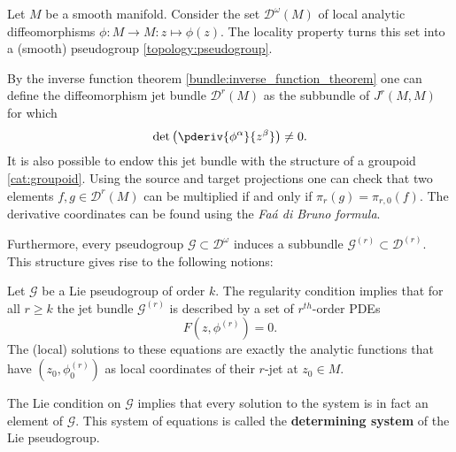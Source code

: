    \begin{example}
        Let $M$ be a smooth manifold. Consider the set $\mathcal{D}^\omega(M)$ of local analytic diffeomorphisms $\phi:M\rightarrow M:z\mapsto\phi(z)$. The locality property turns this set into a (smooth) pseudogroup \ref{topology:pseudogroup}.

        By the inverse function theorem \ref{bundle:inverse_function_theorem} one can define the diffeomorphism jet bundle $\mathcal{D}^r(M)$ as the subbundle of $J^r(M,M)$ for which \[\det\left(\pderiv{\phi^\alpha}{z^\beta}\right)\neq0.\] It is also possible to endow this jet bundle with the structure of a groupoid \ref{cat:groupoid}. Using the source and target projections one can check that two elements $f,g\in\mathcal{D}^r(M)$ can be multiplied if and only if $\pi_r(g)=\pi_{r,0}(f)$. The derivative coordinates can be found using the \textit{Fa\'a di Bruno formula}.
    \end{example}
    Furthermore, every pseudogroup $\mathcal{G}\subset\mathcal{D}^\omega$ induces a subbundle $\mathcal{G}^{(r)}\subset\mathcal{D}^{(r)}$. This structure gives rise to the following notions:
    \begin{property}
        Let $\mathcal{G}$ be a Lie pseudogroup of order $k$. The regularity condition implies that for all $r\geq k$ the jet bundle $\mathcal{G}^{(r)}$ is described by a set of $r^{th}$-order PDEs \[F\left(z,\phi^{(r)}\right) = 0.\] The (local) solutions to these equations are exactly the analytic functions that have $(z_0,\phi^{(r)}_0)$ as local coordinates of their $r$-jet at $z_0\in M$.

        The Lie condition on $\mathcal{G}$ implies that every solution to the system is in fact an element of $\mathcal{G}$. This system of equations is called the \textbf{determining system} of the Lie pseudogroup.
    \end{property}

